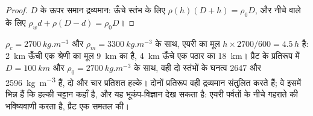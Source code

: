 \begin{proof}
$D$ के ऊपर समान द्रव्यमान: ऊँचे स्तंभ के लिए $\rho(h)(D + h) = \rho_0 D$, और नीचे वाले के लिए $\rho_w d + \rho(D - d) = \rho_0 D$।
\end{proof}

$\rho_c = \qty{2700}{kg.m^{-3}}$ और $\rho_m = \qty{3300}{kg.m^{-3}}$ के साथ, एयरी का मूल $h\times2700/600 = 4.5\,h$ है: \qty{2}{km} ऊँची एक श्रेणी का मूल \qty{9}{km} का है, \qty{4}{km} ऊँचे एक पठार का \qty{18}{km}। प्रैट के प्रतिरूप में $D = \qty{100}{km}$ और $\rho_0 = \qty{2700}{kg.m^{-3}}$ के साथ, वही दो स्तंभों के घनत्व 2647 और \qty{2596}{kg.m^{-3}} हैं, दो और चार प्रतिशत हल्के। दोनों प्रतिरूप वही द्रव्यमान संतुलित करते हैं; वे इसमें भिन्न हैं कि हल्की चट्टान कहाँ है, और यह भूकंप-विज्ञान देख सकता है: एयरी पर्वतों के नीचे गहराते  की भविष्यवाणी करता है, प्रैट एक समतल  की।

